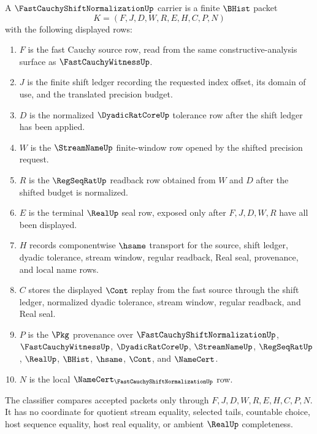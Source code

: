 \begin{definition}
\label{def:fast-cauchy-shift-normalization-carrier}
A $\FastCauchyShiftNormalizationUp$ carrier is a finite $\BHist$ packet
$$
K=(F,J,D,W,R,E,H,C,P,N)
$$
with the following displayed rows:
\begin{enumerate}
\item $F$ is the fast Cauchy source row, read from the same constructive-analysis surface as $\FastCauchyWitnessUp$.
\item $J$ is the finite shift ledger recording the requested index offset, its domain of use, and the translated precision budget.
\item $D$ is the normalized $\DyadicRatCoreUp$ tolerance row after the shift ledger has been applied.
\item $W$ is the $\StreamNameUp$ finite-window row opened by the shifted precision request.
\item $R$ is the $\RegSeqRatUp$ readback row obtained from $W$ and $D$ after the shifted budget is normalized.
\item $E$ is the terminal $\RealUp$ seal row, exposed only after $F,J,D,W,R$ have all been displayed.
\item $H$ records componentwise $\hsame$ transport for the source, shift ledger, dyadic tolerance, stream window, regular readback, Real seal, provenance, and local name rows.
\item $C$ stores the displayed $\Cont$ replay from the fast source through the shift ledger, normalized dyadic tolerance, stream window, regular readback, and Real seal.
\item $P$ is the $\Pkg$ provenance over $\FastCauchyShiftNormalizationUp$, $\FastCauchyWitnessUp$, $\DyadicRatCoreUp$, $\StreamNameUp$, $\RegSeqRatUp$, $\RealUp$, $\BHist$, $\hsame$, $\Cont$, and $\NameCert$.
\item $N$ is the local $\NameCert_{\FastCauchyShiftNormalizationUp}$ row.
\end{enumerate}
The classifier compares accepted packets only through $F,J,D,W,R,E,H,C,P,N$. It has no coordinate for quotient stream equality, selected tails, countable choice, host sequence equality, host real equality, or ambient $\RealUp$ completeness.
\end{definition}

